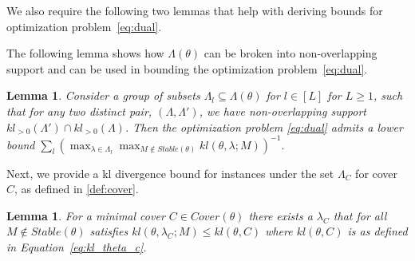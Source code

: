 \documentclass{article}
\newtheorem{lemma}[theorem]{Lemma}
\begin{document}
We also require the following two lemmas that help with deriving bounds for optimization problem~\eqref{eq:dual}.


The following lemma shows how $\Lambda(\theta)$ can be broken into non-overlapping support and can be used in bounding the optimization problem~\eqref{eq:dual}.

\begin{lemma}\label{lemm:dual_lower}
Consider a group of subsets $\Lambda_l \subseteq \Lambda(\theta)$ for $l \in [L]$ for $L \geq 1$, such that for any two distinct pair, $(\Lambda, \Lambda')$, we have non-overlapping support $kl_{>0}(\Lambda') \cap kl_{>0}(\Lambda)$. Then the optimization problem \eqref{eq:dual} admits a lower bound  $\sum_{l}  (\max_{\lambda \in \Lambda_l} \max_{M \notin Stable(\theta)} kl(\theta, \lambda; M))^{-1}$.   
\end{lemma}

Next, we provide a kl divergence bound for instances under the set $\Lambda_C$ for cover $C$, as defined in \ref{def:cover}.
\begin{lemma}\label{lemm:opt_lambda_c}
For a minimal cover $C \in Cover(\theta)$ there exists a $\lambda_C$ that for all $M \notin Stable(\theta)$  satisfies $kl(\theta, \lambda_C; M) \leq kl(\theta, C)$ where $kl(\theta, C)$ is as defined in Equation~\eqref{eq:kl_theta_c}.
\end{lemma}
\end{document}
